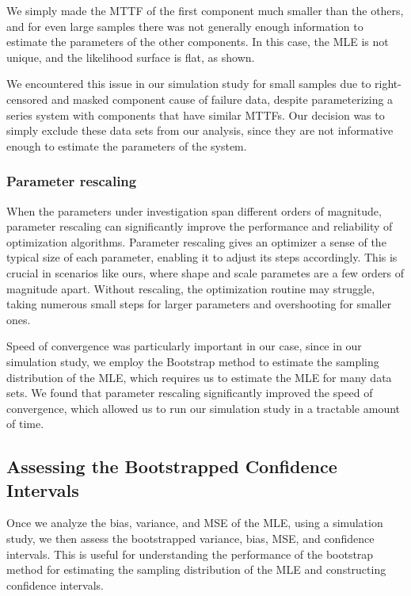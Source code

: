 \documentclass[
]{article}
\begin{document}
We simply made the MTTF of the first component much smaller than the
others, and for even large samples there was not generally enough
information to estimate the parameters of the other components. In this
case, the MLE is not unique, and the likelihood surface is flat, as
shown.

We encountered this issue in our simulation study for small samples due
to right-censored and masked component cause of failure data, despite
parameterizing a series system with components that have similar MTTFs.
Our decision was to simply exclude these data sets from our analysis,
since they are not informative enough to estimate the parameters of the
system.

\hypertarget{parameter-rescaling}{%
\subsubsection*{Parameter rescaling}\label{parameter-rescaling}}

When the parameters under investigation span different orders of
magnitude, parameter rescaling can significantly improve the performance
and reliability of optimization algorithms. Parameter rescaling gives an
optimizer a sense of the typical size of each parameter, enabling it to
adjust its steps accordingly. This is crucial in scenarios like ours,
where shape and scale parametes are a few orders of magnitude apart.
Without rescaling, the optimization routine may struggle, taking
numerous small steps for larger parameters and overshooting for smaller
ones.

Speed of convergence was particularly important in our case, since in
our simulation study, we employ the Bootstrap method to estimate the
sampling distribution of the MLE, which requires us to estimate the MLE
for many data sets. We found that parameter rescaling significantly
improved the speed of convergence, which allowed us to run our
simulation study in a tractable amount of time.

\hypertarget{assessing-the-bootstrapped-confidence-intervals}{%
\subsection{Assessing the Bootstrapped Confidence
Intervals}\label{assessing-the-bootstrapped-confidence-intervals}}

Once we analyze the bias, variance, and MSE of the MLE, using a
simulation study, we then assess the bootstrapped variance, bias, MSE,
and confidence intervals. This is useful for understanding the
performance of the bootstrap method for estimating the sampling
distribution of the MLE and constructing confidence intervals.
\end{document}
